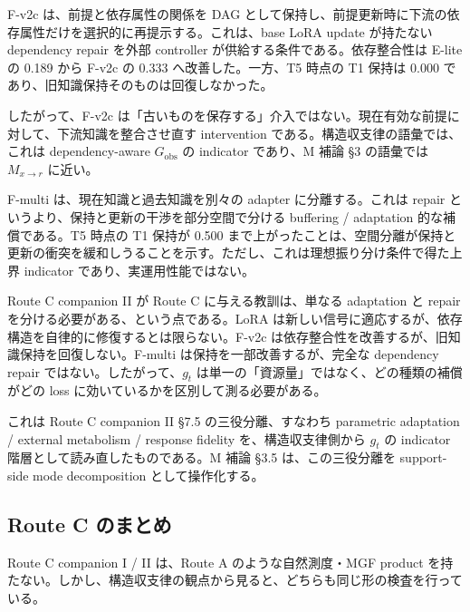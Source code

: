 \documentclass[12pt,a4paper]{article}
\begin{document}
F-v2c は、前提と依存属性の関係を DAG として保持し、前提更新時に下流の依存属性だけを選択的に再提示する。これは、base LoRA update が持たない dependency repair を外部 controller が供給する条件である。依存整合性は E-lite の 0.189 から F-v2c の 0.333 へ改善した。一方、T5 時点の T1 保持は 0.000 であり、旧知識保持そのものは回復しなかった。

したがって、F-v2c は「古いものを保存する」介入ではない。現在有効な前提に対して、下流知識を整合させ直す intervention である。構造収支律の語彙では、これは dependency-aware \(G_{\mathrm{obs}}\) の indicator であり、M 補論 §3 の語彙では \(M_{x\to r}\) に近い。

F-multi は、現在知識と過去知識を別々の adapter に分離する。これは repair というより、保持と更新の干渉を部分空間で分ける buffering / adaptation 的な補償である。T5 時点の T1 保持が 0.500 まで上がったことは、空間分離が保持と更新の衝突を緩和しうることを示す。ただし、これは理想振り分け条件で得た上界 indicator であり、実運用性能ではない。

Route C companion II が Route C に与える教訓は、単なる adaptation と repair を分ける必要がある、という点である。LoRA は新しい信号に適応するが、依存構造を自律的に修復するとは限らない。F-v2c は依存整合性を改善するが、旧知識保持を回復しない。F-multi は保持を一部改善するが、完全な dependency repair ではない。したがって、\(g_{t}\) は単一の「資源量」ではなく、どの種類の補償がどの loss に効いているかを区別して測る必要がある。

これは Route C companion II §7.5 の三役分離、すなわち parametric adaptation / external metabolism / response fidelity を、構造収支律側から \(g_{t}\) の indicator 階層として読み直したものである。M 補論 §3.5 は、この三役分離を support-side mode decomposition として操作化する。

\subsection{Route C のまとめ}\label{route-c-ux306eux307eux3068ux3081}

Route C companion I / II は、Route A のような自然測度・MGF product を持たない。しかし、構造収支律の観点から見ると、どちらも同じ形の検査を行っている。
\end{document}
